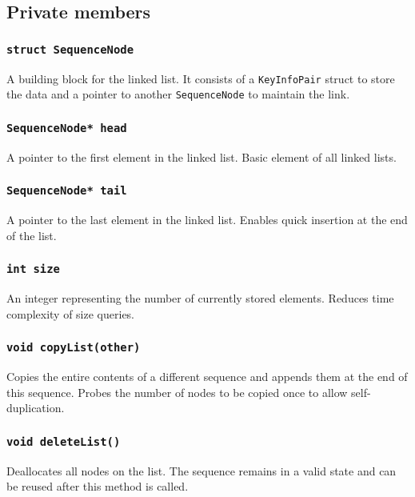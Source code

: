﻿\documentclass{article}
\begin{document}
\subsection{Private members}

\subsubsection{{\tt struct SequenceNode}}

A building block for the linked list. It consists of a {\tt KeyInfoPair} struct
to store the data and a pointer to another {\tt SequenceNode} to maintain the
link.

\subsubsection{{\tt SequenceNode* head}}

A pointer to the first element in the linked list. Basic element of all linked
lists.

\subsubsection{{\tt SequenceNode* tail}}

A pointer to the last element in the linked list. Enables quick insertion at the
end of the list.

\subsubsection{{\tt int size}}

An integer representing the number of currently stored elements. Reduces time
complexity of size queries.

\subsubsection{{\tt void copyList(other)}}

Copies the entire contents of a different sequence and appends them at the end
of this sequence. Probes the number of nodes to be copied once to allow
self-duplication.

\subsubsection{{\tt void deleteList()}}

Deallocates all nodes on the list. The sequence remains in a valid state and can
be reused after this method is called.
\end{document}
